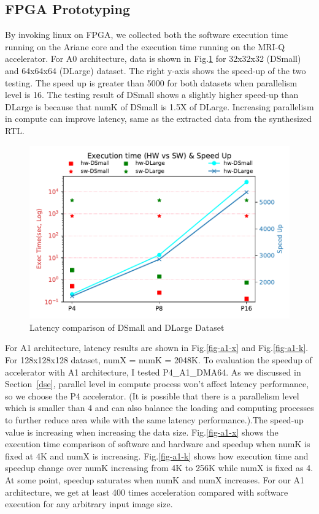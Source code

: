 \subsection{FPGA Prototyping}

By invoking linux on FPGA, we collected both the software execution time running
on the Ariane core and the execution time running on the MRI-Q accelerator. For
A0 architecture, data is shown in Fig.\ref{fig-d32-64} for 32x32x32 (DSmall) and
64x64x64 (DLarge) dataset.  The right y-axis shows the speed-up of the two
testing. The speed up is greater than 5000 for both datasets when parallelism
level is 16. The testing result of DSmall shows a slightly higher speed-up than DLarge
is because that numK of DSmall is 1.5X of DLarge. Increasing parallelism in compute
can improve latency, same as the extracted data from the synthesized RTL.\\

\begin{figure}[h!]
    \centering
    \includegraphics[width=\columnwidth]{figures/a0-both}
    \caption{Latency comparison of DSmall and DLarge Dataset}
    \label{fig-d32-64}
\end{figure}

For A1 architecture, latency results are shown in Fig.\ref{fig-a1-x} and
Fig.\ref{fig-a1-k}. For 128x128x128 dataset, numX = numK = 2048K. To evaluation
the speedup of accelerator with A1 architecture, I tested P4\_A1\_DMA64. As we
discussed in Section~\ref{dse}, parallel level in compute process won't affect latency
performance, so we choose the P4 accelerator. (It is possible that there is a
parallelism level which is smaller than 4 and can also balance the loading and
computing processes to further reduce area while with the same latency
performance.).The speed-up value is increasing when increasing the data
size. Fig.\ref{fig-a1-x} shows the execution time comparison of software and
hardware and speedup when numK is fixed at 4K and numX is
increasing. Fig.\ref{fig-a1-k} shows how execution time and speedup change over
numK increasing from 4K to 256K while numX is fixed as 4.  At some point,
speedup saturates when numK and numX increases. For our A1 architecture, we get
at least 400 times acceleration compared with software execution for any
arbitrary input image size.\\


